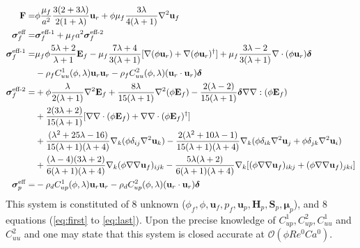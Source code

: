 \begin{align}
    \textbf{F}=&
    \phi
    \frac{\mu_f}{a^2}
    \frac{3(2+3\lambda)}{2(1+\lambda)}\textbf{u}_r
    + \phi\mu_f  \frac{3\lambda}{4(\lambda +1)} \mathbf{\nabla}^2 \textbf{u}_f\\
    \bm\sigma_f^\text{eff}
    =&
    \bm\sigma_f^\text{eff-1}
    + \mu_f a^2 \bm\sigma_f^\text{eff-2} \\
    \bm\sigma_f^\text{eff-1}
    =&
     \mu_f \phi \frac{5\lambda +2}{\lambda+1} \textbf{E}_f
    - \mu_f \frac{7\lambda +4}{3(\lambda+1)} [
    \mathbf{\nabla}(\phi \textbf{u}_r)
    + \mathbf{\nabla}(\phi \textbf{u}_r)^\dagger]
    + \mu_f \frac{3\lambda - 2}{3(\lambda+1)} \mathbf{\nabla}\cdot(\phi \textbf{u}_r)  \bm\delta\nonumber\\
    &-\rho_f C^1_{uu}(\phi,\lambda)  \textbf{u}_r \textbf{u}_r
    -\rho_f C^2_{uu} (\phi,\lambda) (\textbf{u}_r \cdot \textbf{u}_r)\bm\delta\\
    \bm\sigma_f^\text{eff-2}
    =&
    +  \phi \frac{\lambda}{2(\lambda+1)}\mathbf{\nabla}^2 \textbf{E}_f
    +  \frac{8\lambda}{15(\lambda+1)}\mathbf{\nabla}^2(\phi \textbf{E}_f)
    -  \frac{2(\lambda-2)}{15(\lambda+1)}\bm\delta \mathbf{\nabla}\mathbf{\nabla} : (\phi \textbf{E}_f)
    \nonumber
    \\
    &
    + \frac{2(3\lambda+2)}{15(\lambda+1)} 
    [\mathbf{\nabla}\mathbf{\nabla}\cdot(\phi \textbf{E}_f)
    + \mathbf{\nabla}\mathbf{\nabla}\cdot(\phi \textbf{E}_f)^\dagger]\nonumber\\
    &+ \frac{(\lambda^2+25\lambda-16)}{15(\lambda+1)(\lambda+4)}\mathbf{\nabla}_k (\phi \delta_{ij} \mathbf{\nabla}^2\textbf{u}_k)
    - \frac{2(\lambda^2+10\lambda-1)}{15(\lambda+1)(\lambda+4)} \mathbf{\nabla}_k (\phi \delta_{ik} \mathbf{\nabla}^2\textbf{u}_j+\phi \delta_{jk} \mathbf{\nabla}^2\textbf{u}_i)
    \nonumber\\
    &
    +\frac{(\lambda-4)(3\lambda+2)}{6(\lambda+1)(\lambda+4)} \mathbf{\nabla}_k (\phi \mathbf{\nabla}\mathbf{\nabla} \textbf{u}_f)_{ijk}
    - \frac{5\lambda(\lambda+2)}{6(\lambda+1)(\lambda+4)}\mathbf{\nabla}_k [(\phi \mathbf{\nabla}\mathbf{\nabla} \textbf{u}_f)_{ikj}+ (\phi \mathbf{\nabla}\mathbf{\nabla} \textbf{u}_f)_{jki}]
    \nonumber\\
    \bm\sigma_p^\text{eff}
    =&
    -\rho_d C^1_{up}(\phi,\lambda) \textbf{u}_r \textbf{u}_r
    -\rho_d C^2_{up}(\phi,\lambda) (\textbf{u}_r \cdot \textbf{u}_r)\bm\delta
\end{align}
This system is constituted of 8 unknown ($\phi_f,\phi,\textbf{u}_f,p_f,\textbf{u}_p,\textbf{H}_p,\textbf{S}_p,\bm\mu_p$), and 8 equations (\ref{eq:first} to \ref{eq:last}).  
Upon the precise knowledge of $C^1_{up}, C^2_{up}, C^1_{uu}$ and $C^2_{uu}$ and one may state that this system is closed accurate at $\mathcal{O}(\phi Re^0 Ca^0)$. 

